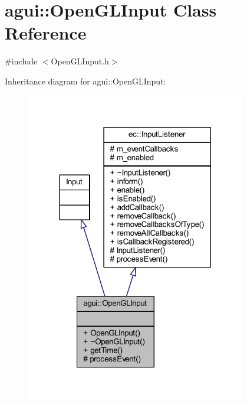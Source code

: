 \hypertarget{classagui_1_1_open_g_l_input}{}\section{agui\+:\+:Open\+G\+L\+Input Class Reference}
\label{classagui_1_1_open_g_l_input}


{\ttfamily \#include $<$Open\+G\+L\+Input.\+h$>$}



Inheritance diagram for agui\+:\+:Open\+G\+L\+Input\+:\nopagebreak
\begin{figure}[H]
\begin{center}
\leavevmode
\includegraphics[width=272pt]{classagui_1_1_open_g_l_input__inherit__graph}
\end{center}
\end{figure}


